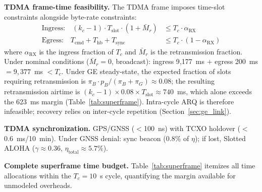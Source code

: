 \documentclass[journal]{IEEEtran}
\begin{document}
\textbf{TDMA frame-time feasibility.} The TDMA frame imposes time-slot constraints alongside byte-rate constraints:
\begin{align}
    \text{Ingress:} \quad (k_c - 1) \cdot T_{\text{slot}} \cdot (1 + \bar{M}_r) &\leq T_c \cdot \alpha_{\text{RX}} \label{eq:ingress_feasibility} \\
    \text{Egress:} \quad T_{\text{cmd}} + T_{\text{hb}} + T_{\text{sync}} &\leq T_c \cdot (1 - \alpha_{\text{RX}}) \label{eq:egress_feasibility}
\end{align}
where $\alpha_{\text{RX}}$ is the ingress fraction of $T_c$ and $\bar{M}_r$ is the retransmission fraction. Under nominal conditions ($\bar{M}_r = 0$, broadcast): ingress 9{,}177~ms $+$ egress 200~ms $= 9{,}377$~ms $< T_c$. Under GE steady-state, the expected fraction of slots requiring retransmission is $\pi_B \cdot p_B / (\pi_B + \pi_G) \approx 0.08$; the resulting retransmission airtime is $(k_c - 1) \times 0.08 \times T_{\text{slot}} \approx 740$~ms, which alone exceeds the 623~ms margin (Table~\ref{tab:superframe}). Intra-cycle ARQ is therefore infeasible; recovery relies on inter-cycle repetition (Section~\ref{sec:ge_link}).

\textbf{TDMA synchronization.} GPS/GNSS ($<$100~ns) with TCXO holdover ($<$0.6~ms/10~min). Under GNSS denial: sync beacon (0.8\% of $\eta$); if lost, Slotted ALOHA ($\gamma \approx 0.36$, $\eta_{\text{total}} \approx 5.7\%$).

\textbf{Complete superframe time budget.} Table~\ref{tab:superframe} itemizes all time allocations within the $T_c = 10$~s cycle, quantifying the margin available for unmodeled overheads.
\end{document}
